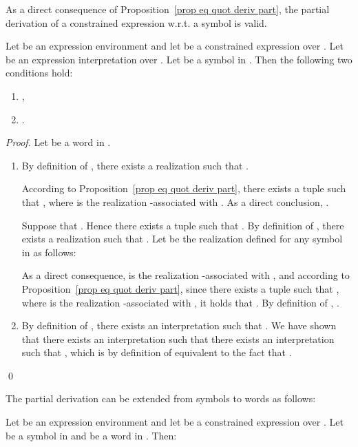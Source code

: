\documentclass[a4paper]{llncs}
\begin{document}
  As a direct consequence of Proposition~\ref{prop eq quot deriv part}, the partial derivation of a constrained expression w.r.t. a symbol is valid.
  
  \begin{theorem}\label{thm egal quot deriv part}
    Let  be an expression environment and let  be a constrained expression over . Let  be an expression interpretation over . Let  be a symbol in . Then the  following two conditions hold:
    \begin{enumerate}
      \item ,
      \item .
    \end{enumerate}
  \end{theorem}
  \begin{proof}
    Let  be a word in . 
    \begin{enumerate}
      \item By definition of ,   there exists a realization  such that .
      
      According to Proposition~\ref{prop eq quot deriv part},      
        there exists a tuple  such that , where  is the realization -associated with . As a direct conclusion, .
      
      Suppose that . Hence there exists a tuple  such that . By definition of , there exists a realization  such that . Let  be the realization defined for any symbol  in  as follows:
        
      
      As a direct consequence,  is the realization -associated with , and according to Proposition~\ref{prop eq quot deriv part}, since there exists a tuple  such that , where  is the realization -associated with , it holds that . By definition of , .
\item By definition of ,   there exists an interpretation  such that . We have shown that there exists an interpretation  such that   there exists an interpretation  such that , 
which is by definition of  equivalent to the fact that  . 
    \end{enumerate}
    \qed
  \end{proof}
  
  The partial derivation can be extended from symbols to words as follows: 
  
  \begin{definition}
    Let  be an expression environment and let  be a constrained expression over . Let  be a symbol in  and  be a word in . Then:
        
  \end{definition}  
  
\end{document}

